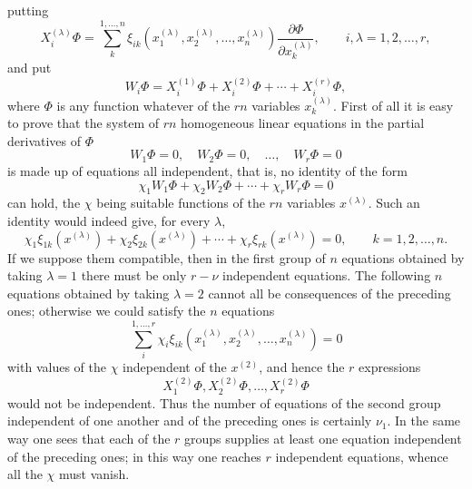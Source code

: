 \documentclass[11pt]{book}
\begin{document}
putting
\[
 X^{(\lambda)}_i\Phi=
 \sum\limits_k^{1,\ldots,n}\xi_{ik}(x^{(\lambda)}_1,x^{(\lambda)}_2,\ldots,x^{(\lambda)}_n)
       \frac{\partial\Phi}{\partial x^{(\lambda)}_k},
 \qquad i,\lambda=1,2,\ldots,r,
\]
and put
\begin{equation*}\tag{8}
 W_i\Phi=X_i^{(1)}\Phi+X_i^{(2)}\Phi+\cdots+X_i^{(r)}\Phi,
\end{equation*}
where $\Phi$ is any function whatever of the $rn$ variables $x^{(\lambda)}_k$. First of all it is easy to prove that the system of $rn$ homogeneous linear equations in the partial derivatives of $\Phi$
\begin{equation*}\tag{9}
 W_1\Phi=0,
 \quad W_2\Phi=0,
 \quad \ldots,
 \quad W_r\Phi=0
\end{equation*}
is made up of equations all independent, that is, no identity of the form
\[
 \chi_1W_1\Phi+\chi_2W_2\Phi+\cdots+\chi_rW_r\Phi=0
\]
can hold, the $\chi$ being suitable functions of the $rn$ variables $x^{(\lambda)}$. Such an identity would indeed give, for every $\lambda$,
\begin{equation*}\tag{10}
 \chi_1\xi_{1k}(x^{(\lambda)})+
 \chi_2\xi_{2k}(x^{(\lambda)})+
 \cdots+
 \chi_r\xi_{rk}(x^{(\lambda)})=0,
 \qquad k=1,2,\ldots,n.
\end{equation*}
If we suppose them compatible, then in the first group of $n$ equations obtained by taking $\lambda=1$ there must be only $r-\nu$ independent equations. The following $n$ equations obtained by taking $\lambda=2$ cannot all be consequences of the preceding ones; otherwise we could satisfy the $n$ equations
\[
 \sum\limits_i^{1,\ldots,r}\chi_i\xi_{ik}(x^{(\lambda)}_1,x^{(\lambda)}_2,\ldots,x^{(\lambda)}_n)=0
\]
with values of the $\chi$ independent of the $x^{(2)}$, and hence the $r$ expressions
\[
 X_1^{(2)}\Phi,
 X_2^{(2)}\Phi,
 \ldots,
 X_r^{(2)}\Phi
\]
would not be independent. Thus the number of equations of the second group independent of one another and of the preceding ones is certainly $\nu_1$. In the same way one sees that each of the $r$ groups supplies at least one equation independent of the preceding ones; in this way one reaches $r$ independent equations, whence all the $\chi$ must vanish.
\end{document}
